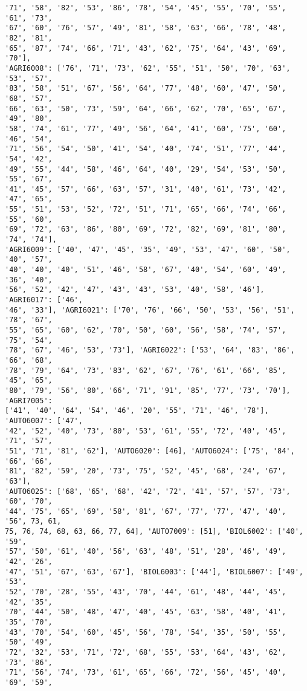 \documentclass[11pt]{article}
\begin{document}
\begin{Verbatim}[commandchars=\\\{\}]
'71', '58', '82', '53', '86', '78', '54', '45', '55', '70', '55', '61', '73',
'67', '60', '76', '57', '49', '81', '58', '63', '66', '78', '48', '82', '81',
'65', '87', '74', '66', '71', '43', '62', '75', '64', '43', '69', '70'],
'AGRI6008': ['76', '71', '73', '62', '55', '51', '50', '70', '63', '53', '57',
'83', '58', '51', '67', '56', '64', '77', '48', '60', '47', '50', '68', '57',
'66', '63', '50', '73', '59', '64', '66', '62', '70', '65', '67', '49', '80',
'58', '74', '61', '77', '49', '56', '64', '41', '60', '75', '60', '46', '54',
'71', '56', '54', '50', '41', '54', '40', '74', '51', '77', '44', '54', '42',
'49', '55', '44', '58', '46', '64', '40', '29', '54', '53', '50', '55', '67',
'41', '45', '57', '66', '63', '57', '31', '40', '61', '73', '42', '47', '65',
'55', '51', '53', '52', '72', '51', '71', '65', '66', '74', '66', '55', '60',
'69', '72', '63', '86', '80', '69', '72', '82', '69', '81', '80', '74', '74'],
'AGRI6009': ['40', '47', '45', '35', '49', '53', '47', '60', '50', '40', '57',
'40', '40', '40', '51', '46', '58', '67', '40', '54', '60', '49', '36', '40',
'56', '52', '42', '47', '43', '43', '53', '40', '58', '46'], 'AGRI6017': ['46',
'46', '33'], 'AGRI6021': ['70', '76', '66', '50', '53', '56', '51', '78', '67',
'55', '65', '60', '62', '70', '50', '60', '56', '58', '74', '57', '75', '54',
'78', '67', '46', '53', '73'], 'AGRI6022': ['53', '64', '83', '86', '66', '68',
'78', '79', '64', '73', '83', '62', '67', '76', '61', '66', '85', '45', '65',
'80', '79', '56', '80', '66', '71', '91', '85', '77', '73', '70'], 'AGRI7005':
['41', '40', '64', '54', '46', '20', '55', '71', '46', '78'], 'AUTO6007': ['47',
'42', '52', '40', '73', '80', '53', '61', '55', '72', '40', '45', '71', '57',
'51', '71', '81', '62'], 'AUTO6020': [46], 'AUTO6024': ['75', '84', '66', '66',
'81', '82', '59', '20', '73', '75', '52', '45', '68', '24', '67', '63'],
'AUTO6025': ['68', '65', '68', '42', '72', '41', '57', '57', '73', '60', '70',
'44', '75', '65', '69', '58', '81', '67', '77', '77', '47', '40', '56', 73, 61,
75, 76, 74, 68, 63, 66, 77, 64], 'AUTO7009': [51], 'BIOL6002': ['40', '59',
'57', '50', '61', '40', '56', '63', '48', '51', '28', '46', '49', '42', '26',
'47', '51', '67', '63', '67'], 'BIOL6003': ['44'], 'BIOL6007': ['49', '53',
'52', '70', '28', '55', '43', '70', '44', '61', '48', '44', '45', '42', '35',
'70', '44', '50', '48', '47', '40', '45', '63', '58', '40', '41', '35', '70',
'43', '70', '54', '60', '45', '56', '78', '54', '35', '50', '55', '50', '49',
'72', '32', '53', '71', '72', '68', '55', '53', '64', '43', '62', '73', '86',
'71', '56', '74', '73', '61', '65', '66', '72', '56', '45', '40', '69', '59',

\end{Verbatim}
\end{document}
